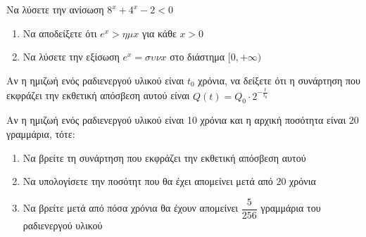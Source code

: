 \documentclass{../presentation}
\begin{document}
\begin{askisi}
  Να λύσετε την ανίσωση $8^x+4^x-2<0$


\end{askisi}

\begin{askisi}
  \begin{enumerate}
    \item<1-> Να αποδείξετε ότι $e^x>ημx$ για κάθε $x>0$
    \item<2-> Να λύσετε την εξίσωση $e^x=συνx$ στο διάστημα $[0,+\infty)$
  \end{enumerate}


\end{askisi}

\begin{askisi}
  Αν η ημιζωή ενός ραδιενεργού υλικού είναι $t_0$ χρόνια, να δείξετε ότι η συνάρτηση που εκφράζει την εκθετική απόσβεση αυτού είναι $Q(t)=Q_0\cdot 2^{-\frac{t}{t_0}}$


\end{askisi}

\begin{askisi}
  Αν η ημιζωή ενός ραδιενεργού υλικού είναι 10 χρόνια και η αρχική ποσότητα είναι $20$ γραμμάρια, τότε:
  \begin{enumerate}
    \item<1-> Να βρείτε τη συνάρτηση που εκφράζει την εκθετική απόσβεση αυτού
    \item<2-> Να υπολογίσετε την ποσότητ που θα έχει απομείνει μετά από $20$ χρόνια
    \item<3-> Να βρείτε μετά από πόσα χρόνια θα έχουν απομείνει $\dfrac{5}{256}$ γραμμάρια του ραδιενεργού υλικού
  \end{enumerate}


\end{askisi}


%
%
%
%
%
%
%
\end{document}
